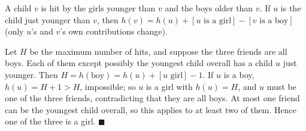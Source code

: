 A child $v$ is hit by the girls younger than $v$ and the boys older than $v$. If $u$ is the child just younger than $v$, then $h(v)=h(u)+[u\text{ is a girl}]-[v\text{ is a boy}]$ (only $u$'s and $v$'s own contributions change).

Let $H$ be the maximum number of hits, and suppose the three friends are all boys. Each of them except possibly the youngest child overall has a child $u$ just younger. Then $H=h(\text{boy})=h(u)+[u\text{ girl}]-1$. If $u$ is a boy, $h(u)=H+1>H$, impossible; so $u$ is a girl with $h(u)=H$, and $u$ must be one of the three friends, contradicting that they are all boys. At most one friend can be the youngest child overall, so this applies to at least two of them. Hence one of the three is a girl. $\blacksquare$
